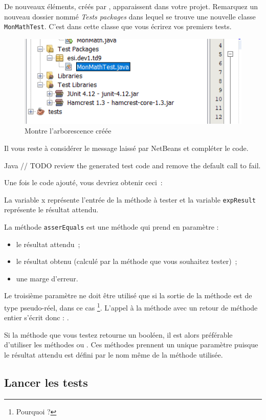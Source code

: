 \documentclass[a4paper,11pt]{style-esi/td}
\begin{document}
De nouveaux éléments, créés par , apparaissent dans votre projet.
Remarquez un nouveau dossier nommé \emph{Tests packages}
dans lequel se trouve une nouvelle classe \texttt{MonMathTest}.
C'est dans cette classe que vous écrirez vos premiers tests.

\begin{figure}[hbt!]
	\centering
	\includegraphics[width=.4\textwidth]{images/libraries}
	\caption{Montre l'arborescence créée}
\end{figure}

Il vous reste à considérer le message laissé par NetBeans et compléter le code.
\begin{Code}{Java}
	// TODO review the generated test code and remove the default call to fail.
\end{Code}

Une fois le code ajouté, vous devriez obtenir ceci~:

La variable x représente l’entrée de la méthode à tester
et la variable \texttt{expResult} représente le résultat attendu.

La méthode \texttt{asserEquals} est une méthode qui prend en paramètre :
\begin{itemize}
	\item le résultat attendu~;
	\item le résultat obtenu (calculé par la méthode que vous souhaitez tester)~;
	\item une marge d’erreur.
\end{itemize}

Le troisième paramètre ne doit être utilisé
que si la sortie de la méthode est de type pseudo-réel, dans ce cas %
\footnote{Pourquoi ?}.
L’appel à la méthode  avec un retour de méthode entier
s’écrit donc : .

Si la méthode que vous testez retourne un booléen,
il est alors préférable d’utiliser les méthodes 
ou .
Ces méthodes prennent un unique paramètre puisque le résultat attendu est défini
par le nom même de la méthode utilisée.

\subsection{Lancer les tests}
\end{document}
